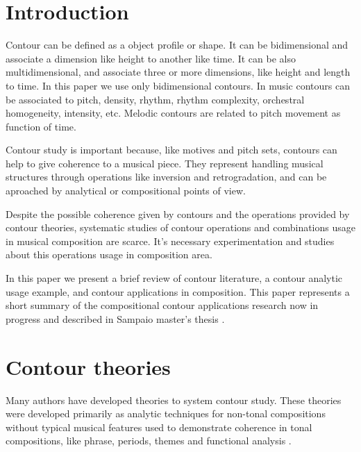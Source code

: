 

\section{Introduction}
\label{sec:introduction}

Contour can be defined as a object profile or shape. It can be
bidimensional and associate a dimension like height to another like
time. It can be also multidimensional, and associate three or more
dimensions, like height and length to time. In this paper we use only
bidimensional contours. In music contours can be associated to pitch,
density, rhythm, rhythm complexity, orchestral homogeneity, intensity,
etc. Melodic contours are related to pitch movement as function of
time.

Contour study is important because, like motives and pitch sets,
contours can help to give coherence to a musical piece. They represent
handling musical structures through operations like inversion and
retrogradation, and can be aproached by analytical or compositional
points of view.

Despite the possible coherence given by contours and the operations
provided by contour theories, systematic studies of contour operations
and combinations usage in musical composition are scarce. It's
necessary experimentation and studies about this operations usage in
composition area.

In this paper we present a brief review of contour literature, a
contour analytic usage example, and contour applications in
composition. This paper represents a short summary of the
compositional contour applications research now in progress and
described in Sampaio master's thesis \cite{sampaio08:em}.

\section{Contour theories}
\label{sec:contour-theories}

Many authors
\cite{friedmann85:methodology,friedmann87:response,morris87:composition,morris93:directions,marvin.ea87:relating,marvin88:generalized,marvin.ea95:generalization,polansky.ea92:possible,quinn97:fuzzy,clifford95:contour,beard03:contour}
have developed theories to system contour study. These theories were
developed primarily as analytic techniques for non-tonal compositions
without typical musical features used to demonstrate coherence in
tonal compositions, like phrase, periods, themes and functional
analysis \cite{beard03:contour}.

